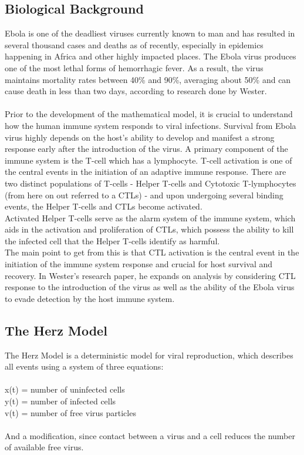 \documentclass{article}
\begin{document}
\subsection{Biological Background}
Ebola is one of the deadliest viruses currently known to man and has resulted in several thousand cases and deaths as of recently, especially in epidemics happening in Africa and other highly impacted places. The Ebola virus produces one of the most lethal forms of hemorrhagic fever. As a result, the virus maintains mortality rates between 40\% and 90\%, averaging about 50\% and can cause death in less than two days, according to research done by Wester.\\
\\
Prior to the development of the mathematical model, it is crucial to understand how the human immune system responds to viral infections. Survival from Ebola virus highly depends on the host's ability to develop and manifest a strong response early after the introduction of the virus. A primary component of the immune system is the T-cell which has a lymphocyte. T-cell activation is one of the central events in the initiation of an adaptive immune response. There are two distinct populations of T-cells - Helper T-cells and Cytotoxic T-lymphocytes (from here on out referred to a CTLs) - and upon undergoing several binding events, the Helper T-cells and CTLs become activated.\\
Activated Helper T-cells serve as the alarm system of the immune system, which aids in the activation and proliferation of CTLs, which possess the ability to kill the infected cell that the Helper T-cells identify as harmful.\\
The main point to get from this is that CTL activation is the central event in the initiation of the immune system response and crucial for host survival and recovery. In Wester's research paper, he expands on analysis by considering CTL response to the introduction of the virus as well as the ability of the Ebola virus to evade detection by the host immune system.

\subsection{The Herz Model}
The Herz Model is a deterministic model for viral reproduction, which describes all events using a system of three equations:\\
\\
	x(t) = number of uninfected cells\\
	y(t) = number of infected cells\\
	v(t) = number of free virus particles\\
\\
And a modification, since contact between a virus and a cell reduces the number of available free virus.
\end{document}

